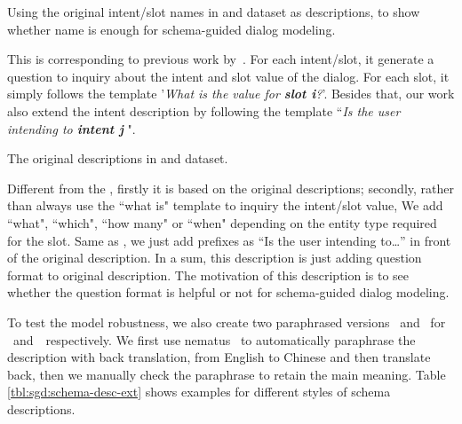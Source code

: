\Paragraph{\NAMEONLY} Using the original intent/slot names in \sgdst
and \multiwoz dataset as descriptions, to show whether name is enough
for schema-guided dialog modeling.

\Paragraph{\QANAMEONLY} This is corresponding to previous
  work by~\citet{gao2019dialog}. For each intent/slot, it generate a
  question to inquiry about the intent and slot value of the
  dialog. For each slot, it simply follows the template '{\it What
    is the value for {\bf slot i}?}'. Besides that, our work also
  extend the intent description by following the template ``{\it Is
    the user intending to {\bf intent j} }".

  \Paragraph{\ORIGIN} The original descriptions in \sgdst and \multiwoz dataset.

  \Paragraph{\QARICH} Different from the \QANAMEONLY, firstly it is
  based on the original descriptions; secondly, rather than always use
  the ``what is" template to inquiry the intent/slot value, We add
  ``what", ``which", ``how many" or ``when" depending on the entity
  type required for the slot.  Same as \QANAMEONLY, we just add
  prefixes as ``Is the user intending to\ldots'' in front of the original
  description. In a sum, this description is just adding question
  format to original description. The motivation of this description is
  to see whether the question format is helpful or not for
  schema-guided dialog modeling.

  To test the model robustness, we also create two paraphrased
  versions \NAMEPARA~and \PARAPHRASE~for
  \NAMEONLY~and~\ORIGIN~respectively. We first use
  nematus~\cite{sennrich-etal-2017-nematus} to automatically
  paraphrase the description with back translation, from English to
  Chinese and then translate back, then we manually check the
  paraphrase to retain the main meaning. Table
  \ref{tbl:sgd:schema-desc-ext} shows examples for different styles of
  schema descriptions.

